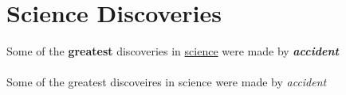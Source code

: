 \documentclass{article}
\begin{document}
	\section{Science Discoveries}
	Some of the \textbf{greatest} discoveries in \underline{science} were made by \textbf{\textit{accident}}
	
	\paragraph{}
	Some of the greatest discoveires in science were made by \emph{accident}
\end{document}

